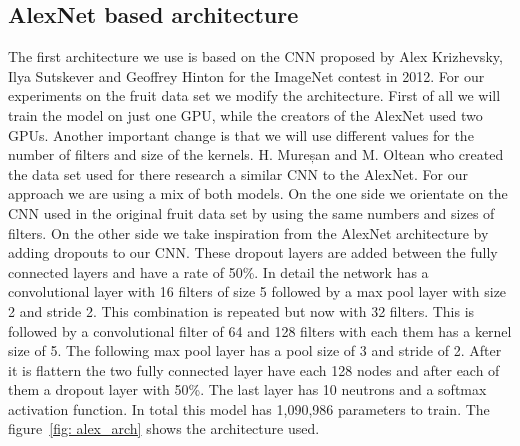 \documentclass[11pt, a4paper]{article}
\begin{document}
\subsection{AlexNet based architecture}
The first architecture we use is based on the CNN proposed by Alex Krizhevsky, Ilya Sutskever and Geoffrey Hinton for the ImageNet contest in 2012.\cite{alexnet}
For our experiments on the fruit data set we modify the architecture. First of all we will train the model on just one GPU, while the creators of the AlexNet used two GPUs. Another important change is that we will use different values for the number of filters and size of the kernels.
H. Mureșan and M. Oltean who created the data set used for there research a similar CNN to the AlexNet. For our approach we are using a mix of both models. On the one side we orientate on the CNN used in the original fruit data set by using the same numbers and sizes of filters.\cite{fruitpaper} On the other side we take inspiration from the AlexNet architecture by adding dropouts to our CNN. These dropout layers are added between the fully connected layers and have a rate of 50\%.\cite[p.~6]{alexnet}
In detail the network has a convolutional layer with 16 filters of size 5 followed by a max pool layer with size 2 and stride 2. This combination is repeated but now with 32 filters. This is followed by a convolutional filter of 64 and 128 filters with each them has a kernel size of 5. The following max pool layer has a pool size of 3 and stride of 2. After it is flattern the two fully connected layer have each 128 nodes and after each of them a dropout layer with 50\%. The last layer has 10 neutrons and a softmax activation function. In total this model has 1,090,986 parameters to train. The figure~\ref{fig: alex_arch} shows the architecture used.
\end{document}
